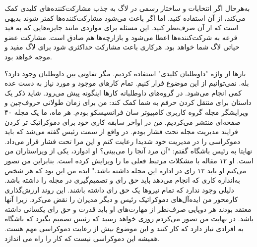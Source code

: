به‌هرحال اگر انتخابات و ساختار رسمی در لاگ به جذب مشارکت‌کننده‌های کلیدی کمک می‌کند، از آن استفاده کنید.
اما اگر باعث می‌شود مشارکت‌کننده‌ها کمتر شوند بدیهی است  که از آن صرف‌نظر کنید. این مسئله برای مواردی
مانند جایزه‌هایی که به قید قرعه به شرکت‌کننده‌ها اعطا می‌شود
و بازارچه‌ها هم صادق است. مشارکت عضو حیاتی لاگ شما خواهد بود. هرکاری باعث مشارکت حداکثری شود
برای لاگ مفید و موجه خواهد بود.

بارها از واژه "داوطلبان کلیدی" استفاده کردیم. مگر تفاوتی بین داوطلبان وجود دارد؟ بله. نمی‌توانیم از این موضوع فرار
کنیم. تمام کارهای موجود و مورد نیاز به دست عده کمی انجام می‌شود. در گروه‌های داوطلبانه کارها اینگونه
پیش می‌رود. شاید ذکر یک داستان برای منتقل کردن حرفم به شما کمک کند:
من برای زمان طولانی حروف‌چین و ویرایشگر مجله گروه کاربری کامپیوتر سان فرانسیسکو بودم. هر ماه، ما یک مجله
۴۰ صفحه‌ای منتشر می‌کردیم. من در اواخر سابقه کاری خود برای دموکراتیک تر کردن فرایند مدیریت مجله تحت فشار بودم.
در واقع از سمت رئیس گفته می‌شد که باید دموکراسی را در مدیریت خود شدیدا رعایت کنم و این مرا تحت فشار قرار می‌داد.
نهایتا به رئیس باشگاه گفتم: "آن مرد آنجا را می‌بینی؟ او ادوارد، یکی از ویراستاران من است.
او ۱۲ مقاله با مشکلات مرتبط فعلی ما را ویرایش کرده است. بنابراین من تصور می‌کنم او باید ۱۲ رای در اداره این
مجله داشته باشد." ایده من این بود که هر شخص به‌اندازه کاری که انجام می‌دهد باید حق رای و تصمیم‌گیری
در مجله را داشته باشد. دلیلی وجود ندارد که تمام نیروها یک حق رای داشته باشند.
این روند ارزش‌گذاری کارمحور من ایده‌آل‌های دموکراتیک رئیس و دیگر مدیران را نقض می‌کرد. زیرا آنها معتقد بودند
هر دوپایی صرف‌نظر از مهارت‌‌های او باید قدرت و حق رای یکسانی داشته باشد.
در نهایت من تصور می‌کردم روزی خواهد رسید که رئیس تصمیم بگیرد که باشگاه به افرادی نیاز دارد که کار کنند و
این موضوع بیش از رعایت دموکراسی مهم هست. همیشه این دموکراسی نیست که کار را راه می اندازد.


